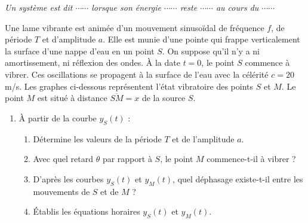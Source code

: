 \documentclass[11pt]{article}
\begin{document}
\textit{Un système est dit $\cdots\cdots$ lorsque son énergie $\cdots\cdots$ reste $\cdots\cdots$ au cours du $\cdots\cdots$}

Une lame vibrante est animée d'un mouvement sinusoïdal de fréquence $f$, de période $T$ et d'amplitude $a$. Elle est munie d'une pointe qui frappe verticalement la surface d'une nappe d'eau en un point $S$. On suppose qu'il n'y a ni amortissement, ni réflexion des ondes. À la date $t = 0$, le point $S$ commence à vibrer. Ces oscillations se propagent à la surface de l'eau avec la célérité $c = 20$ m/s. Les graphes ci-dessous représentent l'état vibratoire des points $S$ et $M$. Le point $M$ est situé à distance $\overline{SM} = x$ de la source $S$.

\begin{center}
\end{center}

\begin{enumerate}
  \item À partir de la courbe $y_S(t)$ :
  \begin{enumerate}[label=\alph*.]
    \item Détermine les valeurs de la période $T$ et de l'amplitude $a$.
    \item Avec quel retard $\theta$ par rapport à $S$, le point $M$ commence-t-il à vibrer ?
    \item D'après les courbes $y_S(t)$ et $y_M(t)$, quel déphasage existe-t-il entre les mouvements de $S$ et de $M$ ?
    \item Établis les équations horaires $y_S(t)$ et $y_M(t)$.
  \end{enumerate}
\end{enumerate}
\end{document}
